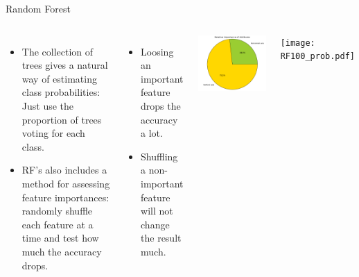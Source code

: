\documentclass[10pt, aspectratio=169]{beamer} %
\begin{document}
\begin{frame}{Random Forest}
\begin{columns}
\begin{itemize}
\item The collection of trees gives a natural way of estimating class
probabilities: Just use the proportion of trees voting for each class.
\item RF's also includes a method for assessing feature importances:
randomly shuffle each feature at a time
	and test how much the accuracy drops.
\end{itemize}
\vspace*{-0.2cm}
\begin{columns}[onlytextwidth]
\begin{itemize}
\item Loosing an important feature drops the accuracy a lot.
\item Shuffling a non-important feature will not change the result much.
\end{itemize}
\centerline{\includegraphics[width=\textwidth]{RF100_importances.pdf}}
\end{columns}
\centerline{\texttt{[image: RF100\_prob.pdf]}}
\end{columns}
\end{frame}
\end{document}
